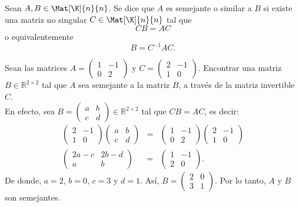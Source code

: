 \documentclass[compacto,10pt]{pubciencias-notas}
\begin{document}
\begin{defi}
Sean $A,B \in \Mat[\K]{n}{n}$. Se dice que $A$ es semejante o similar a $B$ si existe una matriz no singular $C \in \Mat[\K]{n}{n}$ tal que \[ CB = AC\] o equivalentemente \[B=C^{-1}AC.\]
\end{defi}
\begin{ejem}\label{Cap7:ejem01} 
Sean las matrices $A = \begin{pmatrix} 1 & -1 \\ 0 & 2 \end{pmatrix}$ y $C = \begin{pmatrix} 2 & -1 \\ 1 & 0 \end{pmatrix}$. Encontrar una matriz $B\in\mathbb{R}^{2\times 2}$ tal que $A$ sea semejante a la matriz $B$, a través de la matriz invertible $C$. \\
En efecto, sea $B=\begin{pmatrix} a & b \\ c & d \end{pmatrix}\in\mathbb{R}^{2\times 2}$ tal que $CB = AC$, es decir:
\begin{eqnarray*}
\begin{pmatrix} 2 & -1 \\ 1 & 0 \end{pmatrix}
\begin{pmatrix} a & b \\ c & d \end{pmatrix}&=&
\begin{pmatrix} 1 & -1 \\ 0 & 2 \end{pmatrix}
\begin{pmatrix} 2 & -1 \\ 1 & 0 \end{pmatrix}\\
\begin{pmatrix} 2a-c & 2b-d \\ a& b \end{pmatrix}&=&\begin{pmatrix} 1 & -1 \\ 2 & 0 \end{pmatrix}.
\end{eqnarray*}
De donde, $a=2$, $b=0$, $c=3$ y $d=1$. Así, $B=\begin{pmatrix} 2 & 0 \\ 3 & 1 \end{pmatrix}$. Por lo tanto, $A$ y $B$ son semejantes. 
\\

\end{ejem}
\end{document}
